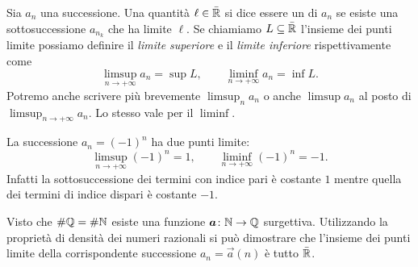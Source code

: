 \begin{definition}
Sia $a_n$ una successione.
Una quantità $\ell\in \bar{\mathbb R}$ si dice essere
un  di $a_n$ se esiste una sottosuccessione
$a_{n_k}$ che ha limite $\ell$. Se chiamiamo $L\subseteq \bar{\mathbb R}$ l'insieme
dei punti limite possiamo definire il \emph{limite superiore} e il
\emph{limite inferiore}
rispettivamente come
\[
\limsup_{n\to +\infty} a_n = \sup L, \qquad
\liminf_{n\to +\infty} a_n = \inf L.
\]
Potremo anche scrivere più brevemente $\limsup_n a_n$ o anche $\limsup a_n$
al posto di $\displaystyle \limsup_{n\to +\infty} a_n$.
Lo stesso vale per il $\liminf$.
\end{definition}

\begin{example}
La successione $a_n=(-1)^n$ ha due punti limite:
\[
  \limsup_{n\to +\infty}(-1)^n = 1, \qquad \liminf_{n\to+\infty} (-1)^n = -1.
\]
Infatti la sottosuccessione dei termini con indice pari è costante $1$ mentre
quella dei termini di indice dispari è costante $-1$.
\end{example}
%
\begin{example}
  Visto che $\#\mathbb Q=\#\mathbb N$ esiste una funzione $\boldsymbol a \colon \mathbb N \to \mathbb Q$
  surgettiva. Utilizzando la proprietà di densità dei numeri razionali
  si può dimostrare che l'insieme dei punti limite della corrispondente successione
  $a_n = \vec a(n)$ è tutto $\bar {\mathbb R}$.
\end{example}
%
